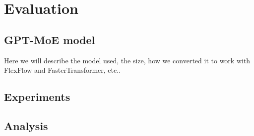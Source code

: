 
\chapter{Evaluation}\label{chapter-9}

\section{GPT-MoE model}
Here we will describe the model used, the size, how we converted it to work with FlexFlow and FasterTransformer, etc..

\section{Experiments}


\section{Analysis}

